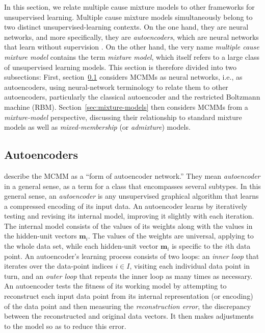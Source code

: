 In this section, we relate multiple cause mixture models to other frameworks for unsupervised learning. 
Multiple cause mixture models simultaneously belong to two distinct unsupervised-learning contexts. 
On the one hand, they are neural networks, and more specifically, they are \emph{autoencoders}, which are neural networks that learn without supervision \citep{bourlard:1988, dayan-and-zemel:95}. %
On the other hand, the very name 
\emph{multiple cause mixture model} 
contains the term \emph{mixture model}, which itself refers to a large class of unsupervised learning models. 
This section is therefore divided into two subsections: First, section~\ref{sec:autoencoders} 
considers MCMMs as neural networks, i.e., as autoencoders, using neural-network terminology 
to relate them to other autoencoders, particularly the classical autoencoder and the restricted Boltzmann machine (RBM).  Section~\ref{sec:mixture-models} then 
considers MCMMs from a \emph{mixture-model} perspective, discussing their 
relationship to standard mixture models as well as \emph{mixed-membership} 
(or \emph{admixture}) models. 

\subsection{Autoencoders}
\label{sec:autoencoders}
\citet[][p. 2]{dayan-and-zemel:95} describe the MCMM as a ``form of autoencoder network.'' 
They mean \emph{autoencoder} in a general sense, as a term for a class that encompasses several subtypes.  
In this general sense, an \emph{autoencoder} is any unsupervised graphical algorithm that
learns a compressed encoding of its input data. 
An autoencoder learns by iteratively testing and revising its internal model, improving it slightly with each iteration. 
The internal model consists of the values of its weights along with 
the values in the hidden-unit vectors $\textbf{m}_i$. The values 
of the weights are universal, applying to the whole data set, while 
each hidden-unit vector $\textbf{m}_i$ is specific to the $i$th data point. 
An autoencoder's learning process consists of two
loops: an \emph{inner loop} that iterates over the data-point indices $i \in I$, 
visiting each individual data point in turn, and an \emph{outer loop} that repeats 
the inner loop as many times as necessary.
An autoencoder tests the fitness of its working model by attempting to reconstruct each input data 
point from its internal representation (or encoding) of the data point 
and then measuring the \emph{reconstruction error}, the discrepancy between the reconstructed and original data vectors.  
It then makes adjustments to the model so as to reduce this error. %

